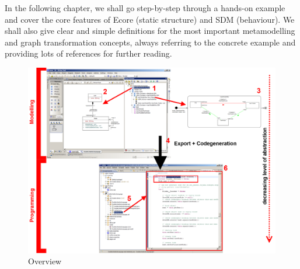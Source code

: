 In the following chapter, we shall go step-by-step through a hands-on example and cover the core features of Ecore (static structure) and SDM (behaviour). 
We shall also give clear and simple definitions for the most important metamodelling and graph transformation concepts, always referring to the concrete example and providing lots of references for further reading.

\begin{figure}[htbp]
	\centering
  \includegraphics[width=1\textwidth]{pics/installationAndSetup/tafelbild}
	\caption{Overview}
	\label{fig_Overview}
\end{figure}